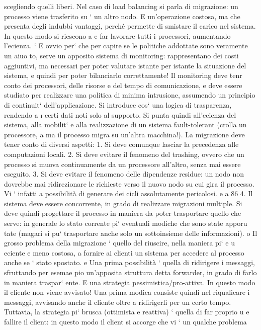 \documentclass[a4paper,12pt]{article}
\begin{document}
scegliendo quelli liberi.
Nel caso di load balancing si parla di migrazione: un processo viene trasferito su
`
un altro nodo. E un'operazione costosa, ma che presenta degli indubbi vantaggi,
perché permette di smistare il carico nel sistema. In questo modo si riescono a
e
far lavorare tutti i processori, aumentando l'ecienza.
`
E ovvio per` che per capire se le politiche addottate sono veramente un aiuo
to, serve un apposito sistema di monitoring: rappresentano dei costi aggiuntivi,
ma necessari per poter valutare istante per istante la situazione del sistema, e
quindi per poter bilanciarlo correttamente! Il monitoring deve tenr conto dei
processori, delle risorse e del tempo di comunicazione, e deve essere studiato per
realizzare una politica di minima intrusione, assumendo un principio di continuit` dell'applicazione. Si introduce cos`
una logica di trasparenza, rendendo
a
\i{}
certi dati noti solo al supporto. Si punta quindi all'ecienza del sistema, alla
mobilit` e alla realizzazione di un sistema fault-tolerant (crolla un processore,
a
ma il processo migra su un'altra macchina!).
La migrazione deve tener conto di diversi aspetti:
1. Si deve comunque lasciar la precedenza alle computazioni locali.
2. Si deve evitare il fenomeno del trashing, ovvero che un processo si muova
continuamente da un processore all'altro, senza mai essere eseguito.
3. Si deve evitare il fenomeno delle dipendenze residue: un nodo non dovrebbe
mai ridirezionare le richieste verso il nuovo nodo su cui gira il processo.
Vi ` infatti a possibilità di generare dei cicli assolutamente pericolosi.
e
a
86
4. Il sistema deve essere concorrente, in grado di realizzare migrazioni multiple.
Si deve quindi progettare il processo in maniera da poter trasportare quello che
serve: in generale lo stato corrente pi` eventuali modiche che sono state apporu
tate (magari si pu` trasportare anche solo un sottoinsieme delle informazioni).
o
Il grosso problema della migrazione ` quello del riuscire, nella maniera pi`
e
u
eciente e meno costosa, a fornire ai clienti un sistema per accedere al processo
anche se ` stato spostato.
e
Una prima possibilità ` quella di ridirigere i messaggi, sfruttando per esemae
pio un'apposita struttura detta forwarder, in grado di farlo in maniera traspar`
ente. E una strategia pessimistica/pro-attiva. In questo modo il cliente non
viene avvisato! Una prima modica consiste quindi nel riqualicare i messaggi,
avvisando anche il cliente oltre a ridirigerli per un certo tempo.
Tuttavia, la strategia pi` brusca (ottimista e reattiva) ` quella di far proprio
u
e
fallire il client: in questo modo il client si accorge che vi ` un qualche problema
\end{document}

